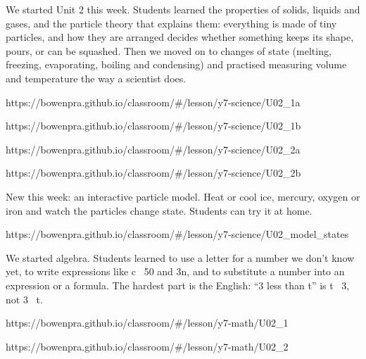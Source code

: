 \documentclass[11pt]{article}
\begin{document}
\begin{annbody}


We started Unit 2 this week. Students learned the properties of solids,
liquids and gases, and the particle theory that explains them: everything is
made of tiny particles, and how they are arranged decides whether something
keeps its shape, pours, or can be squashed. Then we moved on to changes of
state (melting, freezing, evaporating, boiling and condensing) and practised
measuring volume and temperature the way a scientist does.\par
\vspace{3pt}%
  {https://bowenpra.github.io/classroom/\#/lesson/y7-science/U02\_1a}\par
\vspace{3pt}%
  {https://bowenpra.github.io/classroom/\#/lesson/y7-science/U02\_1b}\par
\vspace{3pt}%
  {https://bowenpra.github.io/classroom/\#/lesson/y7-science/U02\_2a}\par
\vspace{3pt}%
  {https://bowenpra.github.io/classroom/\#/lesson/y7-science/U02\_2b}

\vspace{5pt}
New this week: an interactive particle model. Heat or cool ice, mercury,
oxygen or iron and watch the particles change state. Students can try it at
home.\par
\vspace{3pt}%
  {https://bowenpra.github.io/classroom/\#/lesson/y7-science/U02\_model\_states}


We started algebra. Students learned to use a letter for a number we don't
know yet, to write expressions like c \tminus\ 50 and 3n, and to substitute a
number into an expression or a formula. The hardest part is the English:
``3 less than t'' is t \tminus\ 3, not 3 \tminus\ t.\par
\vspace{3pt}%
  {https://bowenpra.github.io/classroom/\#/lesson/y7-math/U02\_1}\par
\vspace{3pt}%
  {https://bowenpra.github.io/classroom/\#/lesson/y7-math/U02\_2}


\end{annbody}
\end{document}
